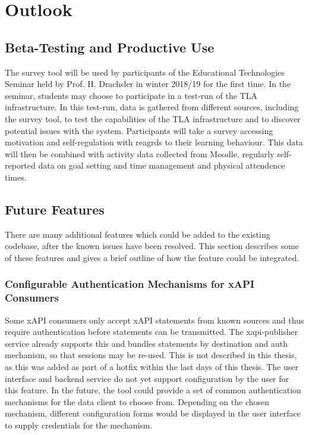 \section{Outlook}
	\subsection{Beta-Testing and Productive Use}
		The survey tool will be used by participants of the Educational Technologies
		Seminar held by Prof. H. Drachsler in winter 2018/19 for the first time.
		In the seminar, students may choose to participate in a test-run
		of the TLA infrastructure. In this test-run, data is gathered
		from different sources, including the survey tool, to test
		the capabilities of the TLA infrastructure and to discover
		potential issues with the system. Participants will
		take a survey accessing motivation and self-regulation
		with reagrds to their learning behaviour. This data will
		then be combined with activity data collected from Moodle,
		regularly self-reported data on goal setting and time management
		and physical attendence times.

	\subsection{Future Features}
		There are many additional features which could be added to
		the existing codebase, after the known issues have been resolved.
		This section describes some of these features and gives a
		brief outline of how the feature could be integrated.

		\subsubsection{Configurable Authentication Mechanisms for xAPI Consumers}
			Some xAPI consumers only accept xAPI statements from known
			sources and thus require authentication before statements
			can be transmitted. The xapi-publisher service already supports
			this and bundles statements by destination and auth mechanism, 
			so that sessions may be re-used. This is not
			described in this thesis, as this was added as part of a hotfix
			within the last days of this thesis. The user interface
			and backend service do not yet support configuration
			by the user for this feature. In the future, the tool
			could provide a set of common authentication mechanisms
			for the data client to choose from. Depending on the
			chosen mechanism, different configuration forms
			would be displayed in the user interface to supply
			credentials for the mechanism. 

